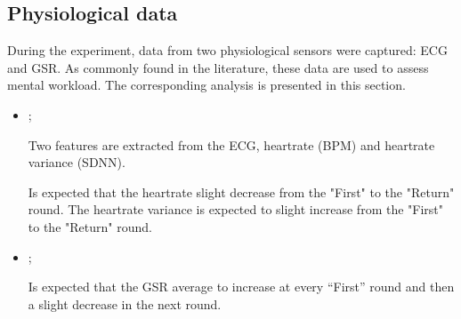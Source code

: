 \subsection{Physiological data}

During the experiment, data from two physiological sensors were captured: ECG and GSR. As commonly found in the literature, these data are used to assess mental workload. The corresponding analysis is presented in this section.

\begin{itemize}
    \item {};
    
        Two features are extracted from the ECG, heartrate (BPM) and heartrate variance (SDNN).
    
        Is expected that the heartrate slight decrease from the "First" to the "Return" round. The heartrate variance is expected to slight increase from the "First" to the "Return" round.
    

    \item {};
    
        Is expected that the GSR average to increase at every “First” round and then a slight decrease in the next round.

\end{itemize}


